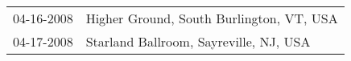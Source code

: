 \begin{supertabular}{ll}
 04-16-2008 &  Higher Ground, South Burlington, VT, USA \\
 04-17-2008 &    Starland Ballroom, Sayreville, NJ, USA \\
\end{supertabular}
